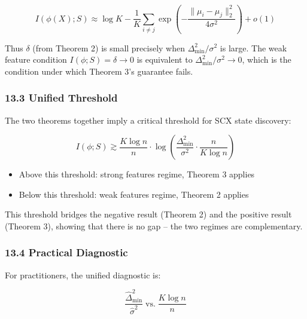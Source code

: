 \documentclass[
  12pt,
]{article}
\providecommand{\tightlist}{%
  \setlength{\itemsep}{0pt}\setlength{\parskip}{0pt}}
\begin{document}
\[I(\phi(X); S) \approx \log K - \frac{1}{K} \sum_{i \neq j} \exp\left(-\frac{\|\mu_i - \mu_j\|_2^2}{4\sigma^2}\right) + o(1)\]

Thus \(\delta\) (from Theorem 2) is small precisely when
\(\Delta_{\min}^2 / \sigma^2\) is large. The weak feature condition
\(I(\phi; S) = \delta \to 0\) is equivalent to
\(\Delta_{\min}^2 / \sigma^2 \to 0\), which is the condition under which
Theorem 3's guarantee fails.

\subsubsection{13.3 Unified Threshold}\label{unified-threshold}

The two theorems together imply a critical threshold for SCX state
discovery:

\[I(\phi; S) \gtrsim \frac{K \log n}{n} \cdot \log\left(\frac{\Delta_{\min}^2}{\sigma^2} \cdot \frac{n}{K \log n}\right)\]

\begin{itemize}
\tightlist
\item
  Above this threshold: strong features regime, Theorem 3 applies
\item
  Below this threshold: weak features regime, Theorem 2 applies
\end{itemize}

This threshold bridges the negative result (Theorem 2) and the positive
result (Theorem 3), showing that there is no gap -- the two regimes are
complementary.

\subsubsection{13.4 Practical Diagnostic}\label{practical-diagnostic}

For practitioners, the unified diagnostic is:

\[\frac{\hat{\Delta}_{\min}^2}{\hat{\sigma}^2} \; \text{vs.} \; \frac{K \log n}{n}\]
\end{document}

